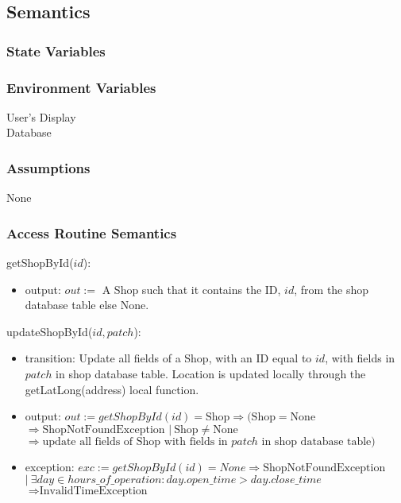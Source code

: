 \documentclass[12pt, titlepage]{article}
\begin{document}
\subsection{Semantics}

\subsubsection{State Variables}

\subsubsection{Environment Variables}

User's Display \\ Database

\subsubsection{Assumptions}

None

\subsubsection{Access Routine Semantics}

\noindent getShopById($id$):
\begin{itemize}
	\item output: $out :=$ A Shop such that it contains the ID, $id$, from the shop database table else None.
\end{itemize}

\noindent updateShopById($id, patch$):
\begin{itemize}
	\item transition: Update all fields of a Shop, with an ID equal to $id$, with fields in $patch$ in shop
	      database table. Location is updated locally through the getLatLong(address) local function.
	\item output: $out := getShopById(id) = \text{Shop} \Rightarrow (\text{Shop} = \text{None} $ \\
		      $\Rightarrow \text{ShopNotFoundException } |\ \text{Shop} \neq \text{None}$ \\ $\Rightarrow
		      \text{update all fields of Shop with fields in } patch \text{ in shop database table})$
	\item exception: $exc := getShopById(id) = None \Rightarrow \text{ShopNotFoundException}$ \\ $|\ \exists
		      day \in hours\_of\_operation : day.open\_time > day.close\_time$ \\ $\Rightarrow
		      \text{InvalidTimeException}$
\end{itemize}
\end{document}
